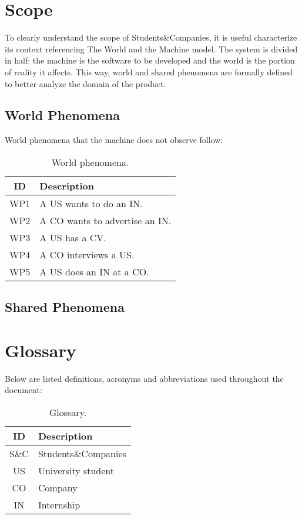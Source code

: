 \documentclass[a4paper, oneside]{book}
\begin{document}
\section{Scope}
To clearly understand the scope of Students\&Companies, it is useful characterize its context referencing The World and the Machine model. The system is divided in half: the machine is the software to be developed and the world is the portion of reality it affects. This way, world and shared phenomena are formally defined to better analyze the domain of the product.

\subsection{World Phenomena}
World phenomena that the machine does not observe follow:

\begin{table}[h]
\renewcommand{\arraystretch}{1.5}
\begin{tabular}{|c|p{10.5 cm}|}
    \hline
    \textbf{ID} & \textbf{Description} \\ \hline \hline
    WP1 & A US wants to do an IN. \\ \hline
    WP2 & A CO wants to advertise an IN. \\ \hline
    WP3 & A US has a CV. \\ \hline
    WP4 & A CO interviews a US. \\ \hline
    WP5 & A US does an IN at a CO. \\ \hline
\end{tabular}
\caption{World phenomena.}
\end{table}

\subsection{Shared Phenomena}
\section{Glossary}
Below are listed definitions, acronyms and abbreviations used throughout the document:

\begin{table}[h]
\renewcommand{\arraystretch}{1.5}
\begin{tabular}{|c|p{10.5 cm}|}
    \hline
    \textbf{ID} & \textbf{Description} \\ \hline \hline
    S\&C & Students\&Companies \\ \hline
    US & University student \\ \hline
    CO & Company \\ \hline
    IN & Internship \\ \hline
\end{tabular}
\caption{Glossary.}
\end{table}
\end{document}
